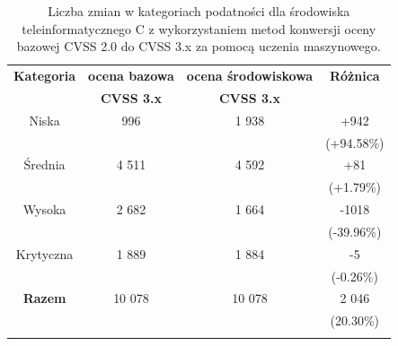 \begin{table}[tbh]
\caption{Liczba zmian w kategoriach podatności dla środowiska teleinformatycznego C z wykorzystaniem metod konwersji oceny bazowej CVSS 2.0 do CVSS 3.x za pomocą uczenia maszynowego.}
\begin{center}
\label{tab:chapter6:env_c:changes_cvss_3}
\begin{tabular}{cccc}
\hline \noalign {\smallskip}
\textbf{Kategoria}  & \textbf{ocena bazowa} & \textbf{ocena środowiskowa} & \textbf{Różnica} \\
                      & \textbf{CVSS 3.x} & \textbf{CVSS 3.x} & \\
\hline \noalign {\smallskip}
  Niska         &   996 &  1 938 &  +942           \\
                &       &        & (+94.58\%)    \\
  Średnia       & 4 511 &  4 592 &  +81            \\
                &       &        & (+1.79\%)      \\
  Wysoka        & 2 682 &  1 664 &  -1018           \\
                &       &        &  (-39.96\%)     \\
  Krytyczna     & 1 889 &  1 884 &  -5           \\
                &       &        &  (-0.26\%)     \\
\hline \noalign {\smallskip}
 \textbf{Razem} & 10 078&  10 078&      2 046 \\
                     &  & &    (20.30\%) \\
\hline \noalign {\smallskip}
\end{tabular}
\end{center}
\end{table}

